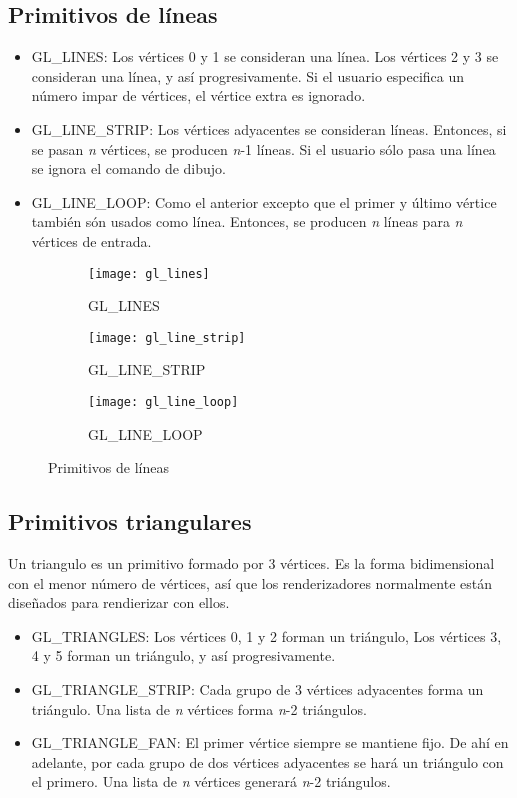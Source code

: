 \subsection{Primitivos de líneas}
\begin{itemize}
\item{GL\_LINES: Los vértices 0 y 1 se consideran una línea. Los vértices 2 y 3 se consideran una línea, y así progresivamente. Si el usuario especifica un número impar de vértices, el vértice extra es ignorado.}
\item{GL\_LINE\_STRIP: Los vértices adyacentes se consideran líneas. Entonces, si se pasan \textit{n} vértices, se producen \textit{n}-1 líneas. Si el usuario sólo pasa una línea se ignora el comando de dibujo.}
\item{GL\_LINE\_LOOP: Como el anterior excepto que el primer y último vértice también són usados como línea. Entonces, se producen \textit{n} líneas para \textit{n} vértices de entrada.}
\end{itemize}


\begin{figure} [h]
  \centering
  \captionsetup[subfigure]{justification=centering}
  \begin{subfigure}  {0.3\textwidth}
    \texttt{[image: gl\_lines]}
    \caption{GL\_LINES}
  \end{subfigure}
  \begin{subfigure} {0.3\textwidth}
    \texttt{[image: gl\_line\_strip]}
    \caption{GL\_LINE\_STRIP}
  \end{subfigure}
  \begin{subfigure} {0.3\textwidth}
    \texttt{[image: gl\_line\_loop]}
    \caption{GL\_LINE\_LOOP}
  \end{subfigure}
  \caption{Primitivos de líneas}
\end{figure}

\restoregeometry


\newpage



\subsection{Primitivos triangulares}
Un triangulo es un primitivo formado por 3 vértices. Es la forma bidimensional con el menor número de vértices, así que los renderizadores normalmente están diseñados para rendierizar con ellos.
\begin{itemize}
\item{GL\_TRIANGLES: Los vértices 0, 1 y 2 forman un triángulo, Los vértices 3, 4 y 5 forman un triángulo, y así progresivamente.}
\item{GL\_TRIANGLE\_STRIP: Cada grupo de 3 vértices adyacentes forma un triángulo. Una lista de \textit{n} vértices forma \textit{n}-2 triángulos.}
\item{GL\_TRIANGLE\_FAN: El primer vértice siempre se mantiene fijo. De ahí en adelante, por cada grupo de dos vértices adyacentes se hará un triángulo con el primero. Una lista de \textit{n} vértices generará \textit{n}-2 triángulos.}
\end{itemize}

